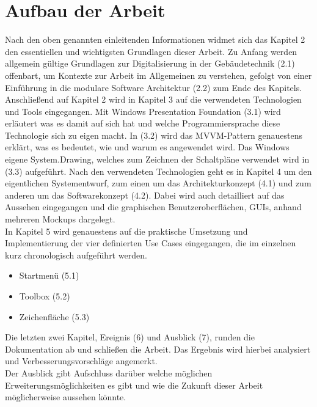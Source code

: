 \section{Aufbau der Arbeit}
Nach den oben genannten einleitenden Informationen widmet sich das Kapitel 2 den essentiellen und wichtigsten Grundlagen dieser Arbeit.
Zu Anfang werden allgemein gültige Grundlagen zur Digitalisierung in der Gebäudetechnik (2.1) offenbart, um Kontexte zur Arbeit im Allgemeinen
zu verstehen, gefolgt von einer Einführung in die modulare Software Architektur (2.2) zum Ende des Kapitels.
\linebreak
\linebreak
Anschließend auf Kapitel 2 wird in Kapitel 3 auf die verwendeten Technologien und Tools eingegangen. Mit Windows Presentation Foundation
(3.1) wird erläutert was es damit auf sich hat und welche Programmiersprache diese Technologie sich zu eigen macht. In (3.2) wird das MVVM-Pattern
genauestens erklärt, was es bedeutet, wie und warum es angewendet wird. Das Windows eigene System.Drawing, welches zum 
Zeichnen der Schaltpläne verwendet wird in (3.3) aufgeführt.
\linebreak
\linebreak
Nach den verwendeten Technologien geht es in Kapitel 4 um den eigentlichen Systementwurf, zum einen um das Architekturkonzept (4.1)
und zum anderen um das Softwarekonzept (4.2). Dabei wird auch detailliert auf das Aussehen eingegangen und die graphischen Benutzeroberflächen, GUIs,
anhand mehreren Mockups dargelegt.
\\
\linebreak
In Kapitel 5 wird genauestens auf die praktische Umsetzung und Implementierung der vier definierten Use Cases eingegangen, 
die im einzelnen kurz chronologisch aufgeführt werden.
\begin{itemize}
    \item Startmenü (5.1)
    \item Toolbox (5.2)
    \item Zeichenfläche (5.3)
\end{itemize}
Die letzten zwei Kapitel, Ereignis (6) und Ausblick (7), runden die Dokumentation ab und schließen die Arbeit. Das Ergebnis wird hierbei
analysiert und Verbesserungsvorschläge angemerkt. 
\\ Der Ausblick gibt Aufschluss darüber welche möglichen Erweiterungsmöglichkeiten es gibt und wie die Zukunft dieser Arbeit möglicherweise aussehen könnte.
